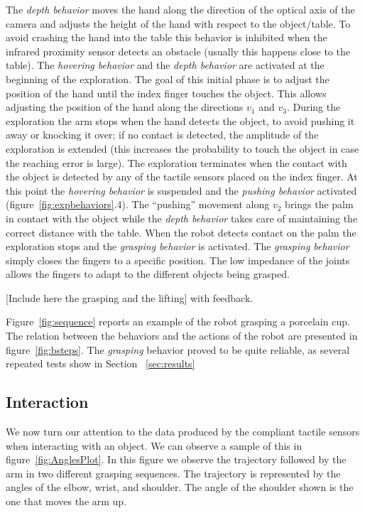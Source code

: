 The \emph{depth behavior} moves the hand along the direction of
the optical axis of the camera and adjusts the height of the hand
with respect to the object/table. To avoid crashing the hand into
the table this behavior is inhibited when the infrared proximity
sensor detects an obstacle (usually this happens close to the
table). The \emph{hovering behavior} and the \emph{depth behavior}
are activated at the beginning of the exploration. The goal of
this initial phase is to adjust the position of the hand until the
index finger touches the object. This allows adjusting the
position of the hand along the directions $v_1$ and $v_3$. During
the exploration the arm stops when the hand detects the object, to
avoid pushing it away or knocking it over; if no contact is
detected, the amplitude of the exploration is extended (this
increases the probability to touch the object in case the reaching
error is large). The exploration terminates when the contact with
the object is detected by any of the tactile sensors placed on the
index finger. At this point the \emph{hovering behavior} is
suspended and the \emph{pushing behavior} activated
(figure~\ref{fig:expbehaviors}.4). The ``pushing'' movement along
$v_2$ brings the palm in contact with the object while the
\emph{depth behavior} takes care of maintaining the correct
distance with the table. When the robot detects contact on the
palm the exploration stops and the \emph{grasping behavior} is
activated. The \emph{grasping behavior} simply closes the fingers
to a specific position. The low impedance of the joints allows the
fingers to adapt to the different objects being grasped.

[Include here the grasping and the lifting] with feedback.

Figure~\ref{fig:sequence} reports an example of the robot grasping
a porcelain cup. The relation between the behaviors and the
actions of the robot are presented in figure~\ref{fig:bsteps}. The
\emph{grasping} behavior proved to be quite reliable, as several
repeated tests show in Section~ \ref{sec:results}

\subsection{Interaction}

We now turn our attention to the data produced by the compliant
tactile sensors when interacting with an object. We can observe a
sample of this in figure~\ref{fig:AnglesPlot}. In this figure we
observe the trajectory followed by the arm in two different
grasping sequences. The trajectory is represented by the angles of
the elbow, wrist, and shoulder. The angle of the shoulder shown is
the one that moves the arm up.

